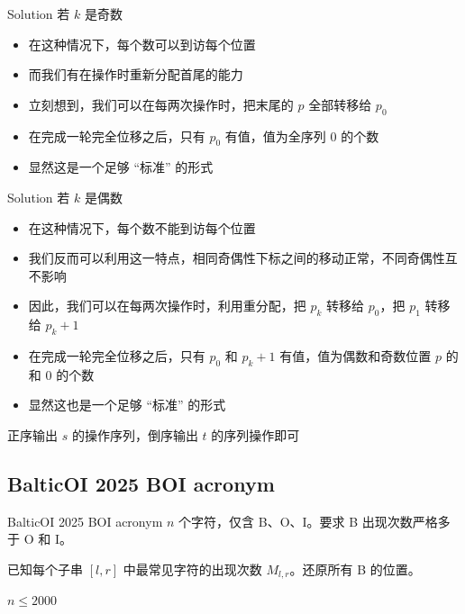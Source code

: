 ﻿\documentclass[aspectratio=169]{ctexbeamer}
\begin{document}
\begin{frame}{Solution}
    若 $k$ 是奇数
    \begin{itemize}
        \item 在这种情况下，每个数可以到访每个位置
        \item 而我们有在操作时重新分配首尾的能力
        \item 立刻想到，我们可以在每两次操作时，把末尾的 $p$ 全部转移给 $p_0$
        \item 在完成一轮完全位移之后，只有 $p_0$ 有值，值为全序列 $0$ 的个数
        \item 显然这是一个足够 “标准” 的形式
    \end{itemize}
\end{frame}

\begin{frame}{Solution}
    若 $k$ 是偶数
    \begin{itemize}
        \item 在这种情况下，每个数不能到访每个位置
        \item 我们反而可以利用这一特点，相同奇偶性下标之间的移动正常，不同奇偶性互不影响
        \item 因此，我们可以在每两次操作时，利用重分配，把 $p_k$ 转移给 $p_0$，把 $p_1$ 转移给 $p_k+1$
        \item 在完成一轮完全位移之后，只有 $p_0$ 和 $p_k+1$ 有值，值为偶数和奇数位置 $p$ 的和 $0$ 的个数
        \item 显然这也是一个足够 “标准” 的形式
    \end{itemize}
    正序输出 $s$ 的操作序列，倒序输出 $t$ 的序列操作即可
\end{frame}









\subsection{BalticOI 2025 BOI acronym}
\begin{frame}{BalticOI 2025 BOI acronym}
    $n$ 个字符，仅含 B、O、I。要求 B 出现次数严格多于 O 和 I。
    
    已知每个子串 $[l,r]$ 中最常见字符的出现次数 $M_{l,r}$。还原所有 B 的位置。
    
    $n\le 2000$
\end{frame}
\end{document}
